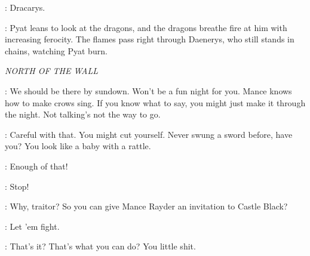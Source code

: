 
\DAENERYS:  Dracarys. 

\NARRATOR: Pyat leans to look at the dragons, and the dragons breathe fire at him with increasing ferocity. The flames pass right through Daenerys, who still stands in chains, watching Pyat burn.



\scene

\textit{NORTH OF THE WALL} 


\YGRITTE: We should be there by sundown. Won't be a fun night for you. Mance knows how to make crows sing. If you know what to say, you might just make it through the night.  Not talking's not the way to go. 


\JON: Careful with that. You might cut yourself. Never swung a sword before, have you? You look like a baby with a rattle. 


\HALFHAND: Enough of that! 


\JON: Stop! 

\HALFHAND:  Why, traitor? So you can give Mance Rayder an invitation to Castle Black? 


\LORDOFBONES: Let 'em fight. 


\HALFHAND:  That's it? That's what you can do? You little shit. 


